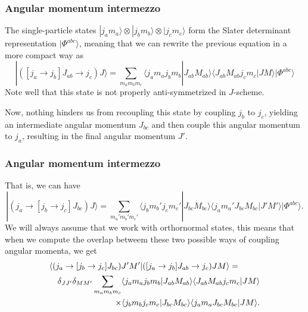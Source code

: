 \documentclass[compress]{beamer}
\begin{document}
\frame
{
\frametitle{Angular momentum intermezzo}
\begin{small}
{\scriptsize
The single-particle states $|j_am_a\rangle\otimes |j_bm_b\rangle \otimes |j_cm_c\rangle$ form the Slater determinant representation
$|\Phi^{abc}\rangle$, meaning that we can rewrite the previous equation in a more compact way as 
\[
| ([j_a\rightarrow j_b]J_{ab}\rightarrow j_c) J\rangle =\sum_{m_am_bm_c}\langle j_am_aj_bm_b|J_{ab}M_{ab}\rangle \langle J_{ab}M_{ab}j_cm_c|JM\rangle |\Phi^{abc}\rangle
\]
Note well that this state is not properly anti-symmetrized in $J$-scheme.\newline

Now, nothing hinders us from recoupling this state by coupling $j_b$ to $j_c$, yielding an intermediate angular momentum $J_{bc}$ and then couple this angular momentum to $j_a$, resulting in the final angular momentum $J'$. 
}
\end{small}
}

\frame
{
\frametitle{Angular momentum intermezzo}
\begin{small}
{\scriptsize
That is, we can have 
\[
| (j_a\rightarrow [j_b\rightarrow j_c]J_{bc}) J\rangle = \sum_{m_a'm_b'm_c'}\langle j_bm_b'j_cm_c'|J_{bc}M_{bc}\rangle \langle j_am_a'J_{bc}M_{bc}|J'M'\rangle|\Phi^{abc}\rangle .
\]
We will always assume that we work with orthornormal states, this means that when we compute the overlap betweem these two possible ways of coupling angular momenta, we get 
\begin{eqnarray}
\nonumber
\lefteqn{ \langle (j_a\rightarrow [j_b\rightarrow j_c]J_{bc}) J'M'| ([j_a\rightarrow j_b]J_{ab}\rightarrow j_c) JM\rangle = } \\
\nonumber
& & \delta_{JJ'}\delta_{MM'}\sum_{m_am_bm_c}\langle j_am_aj_bm_b|J_{ab}M_{ab}\rangle \langle J_{ab}M_{ab}j_cm_c|JM\rangle \\
& & \times \langle j_bm_bj_cm_c|J_{bc}M_{bc}\rangle \langle j_am_aJ_{bc}M_{bc}|JM\rangle . \nonumber
\end{eqnarray}
}
\end{small}
}
\end{document}
